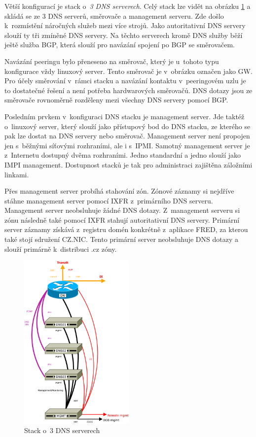 \documentclass[thesis=M,czech]{src/FITthesis}[2019/12/23]
\begin{document}
Větší konfigurací je stack o~\textit{3 DNS serverech}. Celý stack lze vidět na obrázku \ref{fig:infra-3stack} a skládá se ze 3 DNS serverů, směrovače a management serveru. Zde došlo k~rozmístění náročných služeb mezi více strojů. Jako autoritativní DNS servery slouží ty tři zmíněné DNS servery. Na těchto serverech kromě DNS služby běží ještě služba BGP, která slouží pro navázání spojení po BGP se směrovačem.

Navázání peeringu bylo přeneseno na směrovač, který je u~tohoto typu konfigurace vždy linuxový server. Tento směrovač je v~obrázku označen jako GW. Pro účely směrování v~rámci stacku a navázání kontaktu v~peeringovém uzlu je to dostatečné řešení a není potřeba hardwarových směrovačů. DNS dotazy jsou ze směrovače rovnoměrně rozděleny mezi všechny DNS servery pomocí BGP. 

Posledním prvkem v~konfiguraci DNS stacku je management server. Jde taktéž o~linuxový server, který slouží jako přístupový bod do DNS stacku, ze kterého se pak lze dostat na DNS servery nebo směrovač. Management server není propojen jen s~běžnými síťovými rozhraními, ale i s~IPMI. Samotný management server je z~Internetu dostupný dvěma rozhraními. Jedno standardní a jedno slouží jako IMPI management. Dostupnost stacků je tak pro administraci zajištěna záložními linkami. 

Přes management server probíhá stahování zón. Zónové záznamy si nejdříve stáhne management server pomocí IXFR z~primárního DNS serveru. Management server neobsluhuje žádné DNS dotazy. Z~management serveru si zónu následně také pomocí IXFR stahují autoritativní DNS servery. Primární server záznamy získává z~registru domén konkrétně z~aplikace FRED, za kterou také stojí sdružení CZ.NIC. Tento primární server neobsluhuje DNS dotazy a slouží primárně k~distribuci .cz zóny. 

\begin{figure}[ht]
  \centering
   \includegraphics[width=0.5\textwidth]{images/infrastructure-3stack.pdf}
   \caption{Stack o~3 DNS serverech}
     \label{fig:infra-3stack}
\end{figure}
\end{document}

